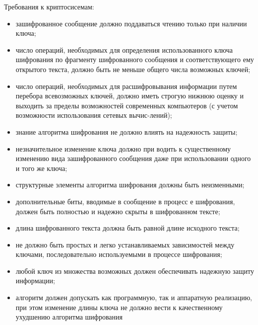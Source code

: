Требования к криптосисемам:

\begin{itemize}[noitemsep,nolistsep,label={--}]
	\item зашифрованное сообщение должно поддаваться чтению только при наличии ключа; 
	\item число операций, необходимых для определения использованного ключа шифрования по фрагменту шифрованного сообщения и соответствующего ему открытого текста, должно быть не меньше общего числа возможных ключей;
	\item число операций, необходимых для расшифровывания информации путем перебора всевозможных ключей, должно иметь строгую нижнюю оценку и выходить за пределы возможностей современных компьютеров (с учетом возможности использования сетевых вычис-лений);
	\item знание алгоритма шифрования не должно влиять на надежность защиты; 
	\item незначительное изменение ключа должно при водить к существенному изменению вида зашифрованного сообщения даже при использовании одного и того же ключа;
	\item структурные элементы алгоритма шифрования должны быть неизменными; 
	\item дополнительные биты, вводимые в сообщение в процесс е шифрования, должен быть полностью и надежно скрыты в шифрованном тексте;
	\item длина шифрованного текста должна быть равной длине исходного текста; 
	\item не должно быть простых и легко устанавливаемых зависимостей между ключами, последовательно используемыми в процессе шифрования;
	\item любой ключ из множества возможных должен обеспечивать надежную защиту информации; 
	\item алгоритм должен допускать как программную, так и аппаратную реализацию, при этом изменение длины ключа не должно вести к качественному ухудшению алгоритма шифрования
\end{itemize}
